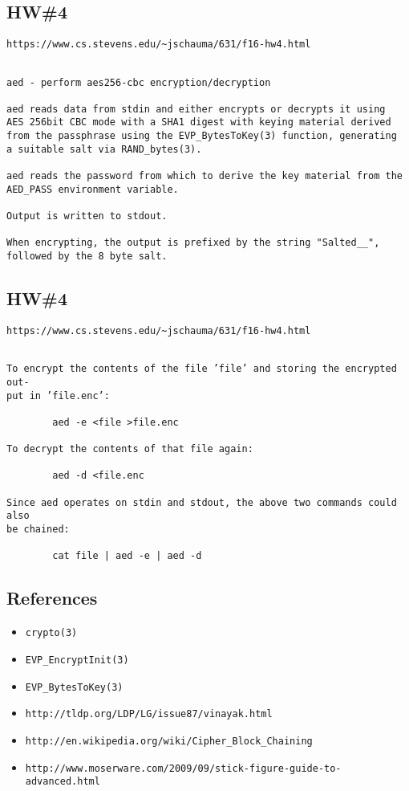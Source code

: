 \documentclass[xga]{xdvislides}
\begin{document}
\subsection{HW\#4}
\begin{verbatim}
https://www.cs.stevens.edu/~jschauma/631/f16-hw4.html
\end{verbatim}
\begin{verbatim}

aed - perform aes256‐cbc encryption/decryption

aed reads data from stdin and either encrypts or decrypts it using
AES 256bit CBC mode with a SHA1 digest with keying material derived
from the passphrase using the EVP_BytesToKey(3) function, generating
a suitable salt via RAND_bytes(3).

aed reads the password from which to derive the key material from the
AED_PASS environment variable.

Output is written to stdout.

When encrypting, the output is prefixed by the string "Salted__",
followed by the 8 byte salt.
\end{verbatim}
\Normalsize

\subsection{HW\#4}
\begin{verbatim}
https://www.cs.stevens.edu/~jschauma/631/f16-hw4.html
\end{verbatim}
\begin{verbatim}

To encrypt the contents of the file ’file’ and storing the encrypted out-
put in ’file.enc’:

        aed -e <file >file.enc

To decrypt the contents of that file again:

        aed -d <file.enc

Since aed operates on stdin and stdout, the above two commands could also
be chained:

        cat file | aed -e | aed -d
\end{verbatim}
\Normalsize

\subsection{References}
\begin{itemize}
	\item {\tt crypto(3)}
	\item {\tt EVP\_EncryptInit(3)}
	\item {\tt EVP\_BytesToKey(3)}
	\item {\tt http://tldp.org/LDP/LG/issue87/vinayak.html}
	\item {\tt http://en.wikipedia.org/wiki/Cipher\_Block\_Chaining}
	\item {\tt http://www.moserware.com/2009/09/stick-figure-guide-to-advanced.html}
\end{itemize}
\end{document}
